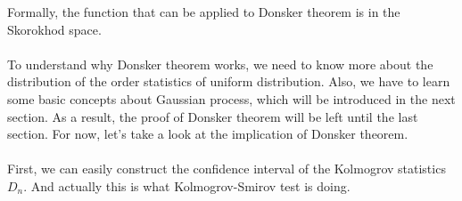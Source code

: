 \documentclass[final_project_1.tex]{subfiles}
\begin{document}
\begin{remark}
Formally, the function that can be applied to Donsker theorem is in the Skorokhod space.
\end{remark}

\paragraph{}
To understand why Donsker theorem works, we need to know more about the distribution of the order statistics of uniform distribution. Also, we have to learn some basic concepts about Gaussian process, which will be introduced in the next section. As a result, the proof of Donsker theorem will be left until the last section. For now, let's take a look at the implication of Donsker theorem.

\paragraph{}
First, we can easily construct the confidence interval of the Kolmogrov statistics $D_n$. And actually this is what Kolmogrov-Smirov test is doing.
\end{document}
